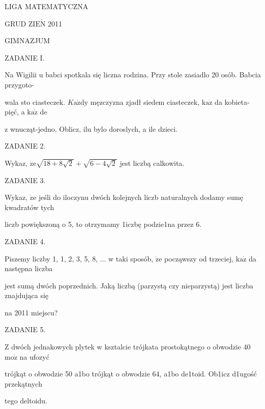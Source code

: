 \documentclass[a4paper,12pt]{article}
\begin{document}
LIGA MATEMATYCZNA

GRUD Z$\mathrm{I}\mathrm{E}\acute{\mathrm{N}}$ 2011

GIMNAZJUM

ZADANIE I.

Na Wigilii $\mathrm{u}$ babci spotkala się liczna rodzina. Przy stole zasiadlo 20 osób. Babcia przygoto-

wala sto ciasteczek. $K\mathrm{a}\dot{\mathrm{z}}\mathrm{d}\mathrm{y}$ męzczyzna zjadł siedem ciasteczek, $\mathrm{k}\mathrm{a}\dot{\mathrm{z}}$ da kobieta- pięć, a $\mathrm{k}\mathrm{a}\dot{\mathrm{z}}$ de

z wnucząt-jedno. Oblicz, ilu bylo doroslych, a ile dzieci.

ZADANIE 2.

Wykaz, $\dot{\mathrm{z}}\mathrm{e}\sqrt{18+8\sqrt{2}}+\sqrt{6-4\sqrt{2}}$ jest liczbą calkowita.

ZADANIE 3.

Wykaz, $\dot{\mathrm{z}}\mathrm{e}$ jeśli do iloczynu dwóch kolejnych liczb naturalnych dodamy sumę kwadratów tych

liczb powiększoną o 5, to otrzymamy 1iczbę podzie1na przez 6.

ZADANIE 4.

Piszemy liczby 1, 1, 2, 3, 5, 8, $\ldots$ w taki sposób, $\dot{\mathrm{z}}\mathrm{e}$ począwszy od trzeciej, $\mathrm{k}\mathrm{a}\dot{\mathrm{z}}$ da następna liczba

jest sumą dwóch poprzednich. Jaką liczbą (parzystą czy nieparzystą) jest liczba znajdująca się

na 2011 miejscu?

ZADANIE 5.

$\mathrm{Z}$ dwóch jednakowych plytek w ksztalcie trójkata prostokątnego o obwodzie 40 $\mathrm{m}\mathrm{o}\dot{\mathrm{z}}$ na ufozyć

trójkąt o obwodzie 50 a1bo trójkąt o obwodzie 64, a1bo de1toid. Ob1icz d1ugość przekątnych

tego deltoidu.
\end{document}
